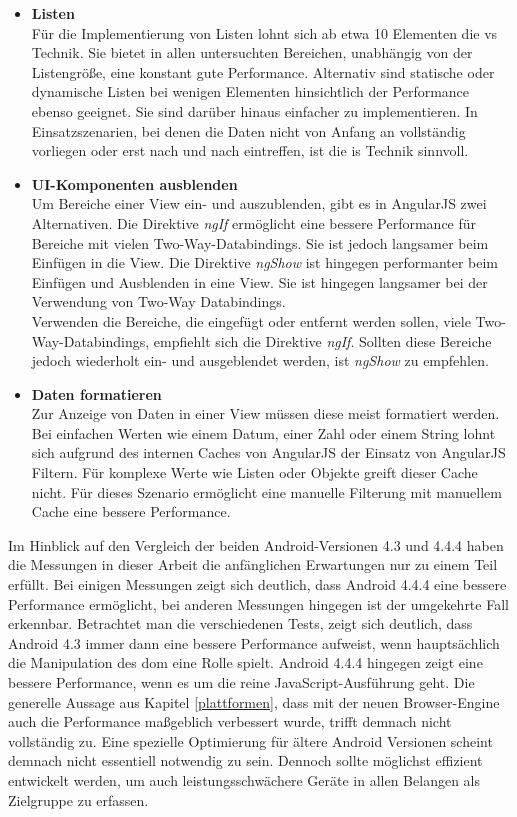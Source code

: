 \begin{itemize}
	\item \textbf{Listen}\\
	Für die Implementierung von Listen lohnt sich ab etwa 10 Elementen die \gls{vs} Technik. Sie bietet in allen untersuchten Bereichen, unabhängig von der Listengröße, eine konstant gute Performance. Alternativ sind statische oder dynamische Listen bei wenigen Elementen hinsichtlich der Performance ebenso geeignet. Sie sind darüber hinaus einfacher zu implementieren. In Einsatzszenarien, bei denen die Daten nicht von Anfang an vollständig vorliegen oder erst nach und nach eintreffen, ist die \gls{is} Technik sinnvoll. 
	
	\item \textbf{UI-Komponenten ausblenden}\\
	Um Bereiche einer View ein- und auszublenden, gibt es in AngularJS zwei Alternativen. Die Direktive \emph{ngIf} ermöglicht eine bessere Performance für Bereiche mit vielen Two-Way-Databindings. Sie ist jedoch langsamer beim Einfügen in die View. Die Direktive \emph{ngShow} ist hingegen performanter beim Einfügen und Ausblenden in eine View. Sie ist hingegen langsamer bei der Verwendung von Two-Way Databindings.\\
	Verwenden die Bereiche, die eingefügt oder entfernt werden sollen, viele Two-Way-Databindings, empfiehlt sich die Direktive \emph{ngIf}. Sollten diese Bereiche jedoch wiederholt ein- und ausgeblendet werden, ist \emph{ngShow} zu empfehlen.
	
	\item \textbf{Daten formatieren}\\
	Zur Anzeige von Daten in einer View müssen diese meist formatiert werden. Bei einfachen Werten wie einem Datum, einer Zahl oder einem String lohnt sich aufgrund des internen Caches von AngularJS der Einsatz von AngularJS Filtern. Für komplexe Werte wie Listen oder Objekte greift dieser Cache nicht. Für dieses Szenario ermöglicht eine manuelle Filterung mit manuellem Cache eine bessere Performance. 
\end{itemize}
Im Hinblick auf den Vergleich der beiden Android-Versionen 4.3 und 4.4.4 haben die Messungen in dieser Arbeit die anfänglichen Erwartungen nur zu einem Teil erfüllt. Bei einigen Messungen zeigt sich deutlich, dass Android 4.4.4 eine bessere Performance ermöglicht, bei anderen Messungen hingegen ist der umgekehrte Fall erkennbar. Betrachtet man die verschiedenen Tests, zeigt sich deutlich, dass Android 4.3 immer dann eine bessere Performance aufweist, wenn hauptsächlich die Manipulation des \gls{dom} eine Rolle spielt. Android 4.4.4 hingegen zeigt eine bessere Performance, wenn es um die reine JavaScript-Ausführung geht. Die generelle Aussage aus Kapitel \ref{plattformen}, dass mit der neuen Browser-Engine auch die Performance maßgeblich verbessert wurde, trifft demnach nicht vollständig zu. Eine spezielle Optimierung für ältere Android Versionen scheint demnach nicht essentiell notwendig zu sein. Dennoch sollte möglichst effizient entwickelt werden, um auch leistungsschwächere Geräte in allen Belangen als Zielgruppe zu erfassen. 
